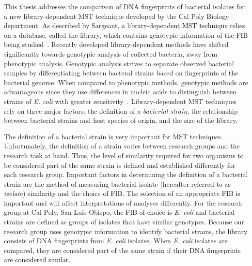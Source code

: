 \documentclass[12pt]{ucthesis}
\begin{document}
   This thesis addresses the comparison of DNA fingerprints of bacterial
   isolates for a new library-dependent MST technique developed by the Cal
   Poly Biology department. As described by Sargeant, a library-dependent MST
   technique relies on a database, called the library, which contains genotypic
   information of the FIB being studied~\cite{Sargeant:ReviewMST}. Recently
   developed library-dependent methods have shifted significantly towards
   genotypic analysis of collected bacteria, away from phenotypic analysis.
   Genotypic analysis strives to separate observed bacterial samples by
   differentiating between bacteral strains based on fingerprints of the
   bacterial genome. When compared to phenotypic methods, genotypic methods are
   advantageous since they use differences in nucleic acids to distinguish
   between strains of \textit{E. coli} with greater
   sensitivity~\cite{Anderson:Diversity, Gordon:StrainTyping, Ochman:Enzyme,
   Scott:CurrentMST, Simpson:StateOf}. Library-dependent MST techniques rely
   on three major factors: the definition of a \textit{bacterial strain}, the
   relationship between bacterial strains and host species of origin, and the
   size of the library.

   The definition of a bacterial strain is very important for MST
   techniques. Unfortunately, the definition of a strain varies between
   research groups and the research task at hand. Thus, the level of similarity
   required for two organisms to be considered part of the same strain is
   defined and established differently for each research group. Important
   factors in determining the definition of a bacterial strain are the method
   of measuring bacterial isolate (hereafter referred to as \textit{isolate})
   similarity and the choice of FIB. The selection of an appropriate FIB is
   important and will affect interpretations of analyses differently. For the
   research group at Cal Poly, San Luis Obispo, the FIB of choice is \textit{E.
   coli} and bacterial strains are defined as groups of isolates that have
   similar genotypes. Because our research group uses genotypic information to
   identify bacterial strains, the library consists of DNA fingerprints from
   \textit{E. coli} isolates. When \textit{E. coli} isolates are compared, they
   are considered part of the same strain if their DNA fingerprints are
   considered similar.
\end{document}
